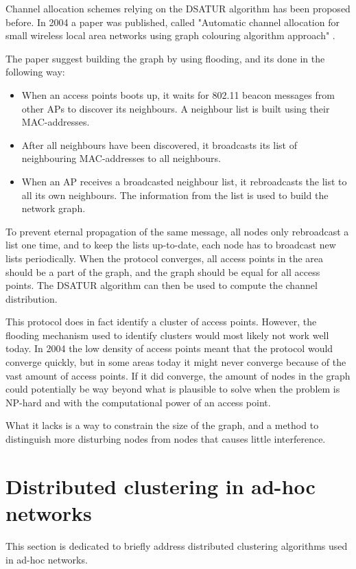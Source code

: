Channel allocation schemes relying on the DSATUR algorithm has been proposed before. In 2004 a paper was published, called
"Automatic channel allocation for small wireless local area networks using graph colouring algorithm approach" \cite{mahonen}.

The paper suggest building the graph by using flooding, and its done in the following way:
\begin{itemize}
	\item When an access points boots up, it waits for 802.11 beacon messages from other APs to discover its neighbours. A neighbour list is built using their MAC-addresses. 
	\item After all neighbours have been discovered, it broadcasts its list of neighbouring MAC-addresses to all neighbours.  
	\item When an AP receives a broadcasted neighbour list, it rebroadcasts the list to all its own neighbours. The information from the list is used to build the network graph. 
\end{itemize}

To prevent eternal propagation of the same message, all nodes only rebroadcast a list one time, and to keep the lists up-to-date, each node has to broadcast new
lists periodically. When the protocol converges, all access points in the area should be a part of the graph, and the graph should be equal for all access points. The DSATUR algorithm can then be used to compute the channel distribution.

This protocol does in fact identify a cluster of access points. However, the flooding mechanism used to identify clusters
would most likely not work well today. In 2004 the low density of access points meant that the protocol would converge quickly, but in some areas today it might never converge because
of the vast amount of access points. If it did converge, the amount of nodes in the graph could potentially be way beyond what is plausible to solve when the problem is NP-hard and with the computational power of an access point. 

What it lacks is a way to constrain the size of the graph, and a method to distinguish more disturbing nodes from nodes that causes little interference.

%
\section{Distributed clustering in ad-hoc networks}
This section is dedicated to briefly address distributed clustering algorithms used in ad-hoc networks.

